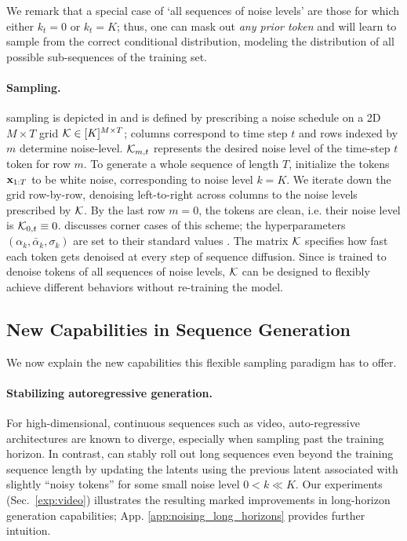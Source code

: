 We remark that a special case of `all sequences of noise levels' are those for which either $k_t = 0$ or $k_t = K$; thus, one can mask out \emph{any prior token} and \algshort{} will learn to sample from the correct conditional distribution, modeling the distribution of all possible sub-sequences of the training set. 


\paragraph{Sampling.}
\label{sec:zigzag_example}
\algo{} sampling is depicted in   and is defined by prescribing a noise schedule on a 2D $M \times T$ grid $\mathcal{K} \in [K]^{M\times T}$; columns correspond to time step $t$ and rows indexed by $m$ determine noise-level. $\mathcal{K}_{m,t}$ represents the desired noise level of the time-step $t$ token for row $m$.  
To generate a whole sequence of length $T$,  initialize the tokens $\mathbf{x}_{1:T}$ to be white noise, corresponding to noise level $k = K$. We iterate down the grid row-by-row, denoising left-to-right across columns to the noise levels prescribed by $\mathcal{K}$. By the last row $m = 0$, the tokens are clean, i.e. their noise level is $\mathcal{K}_{0,t} \equiv 0$.  discusses corner cases of this scheme; the  hyperparameters $(\alpha_k,\bar{\alpha}_k,\sigma_k)$ are set to their standard values \cite{ddpm}. The matrix $\mathcal{K}$ specifies how fast each token gets denoised at every step of sequence diffusion. Since \algo{} is trained to denoise tokens of all sequences of noise levels, $\mathcal{K}$ can be designed to flexibly achieve different behaviors without re-training the model. 






\subsection{New Capabilities in Sequence Generation}
We now explain the new capabilities this flexible sampling paradigm has to offer. 



\paragraph{Stabilizing autoregressive generation.}
\label{par:stabilizing_autoreg}
For high-dimensional, continuous sequences such as video, auto-regressive architectures are known to diverge, especially when sampling past the training horizon.
In contrast, \algo{} can stably  roll out long sequences even beyond the training sequence length by updating the latents using the previous latent associated with  slightly ``noisy tokens'' for some small noise level $0 < k \ll K$. Our experiments (Sec.~\ref{exp:video}) illustrates the resulting marked improvements in long-horizon generation capabilities;  App. \ref{app:noising_long_horizons} provides further intuition.

